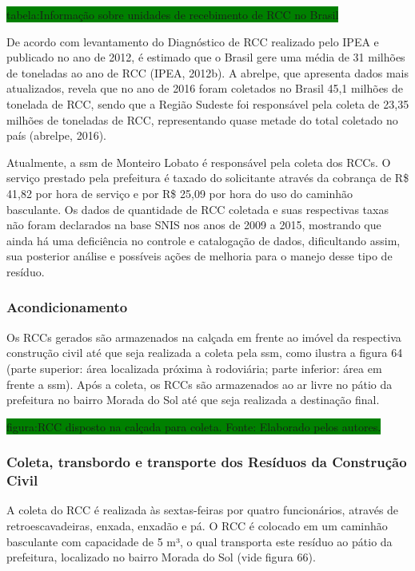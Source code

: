 	\colorbox{green}{tabela:Informação sobre unidades de recebimento de RCC no Brasil}
	
	De acordo com levantamento do Diagnóstico de RCC realizado pelo IPEA e publicado no ano de 2012, é estimado que o Brasil gere uma média de 31 milhões de toneladas ao ano de RCC (IPEA, 2012b). A \gls{abrelpe}, que apresenta dados mais atualizados, revela que no ano de 2016 foram coletados no Brasil 45,1 milhões de tonelada de RCC, sendo que a Região Sudeste foi responsável pela coleta de 23,35 milhões de toneladas de RCC, representando quase metade do total coletado no país (\gls{abrelpe}, 2016).	
	
	Atualmente, a \gls{ssm} de Monteiro Lobato é responsável pela coleta dos RCCs. O serviço prestado pela prefeitura é taxado do solicitante através da cobrança de R\$ 41,82 por hora de serviço e por R\$ 25,09 por hora do uso do caminhão basculante. Os dados de quantidade de RCC coletada e suas respectivas taxas não foram declarados na base SNIS nos anos de 2009 a 2015, mostrando que ainda há uma deficiência no controle e catalogação de dados, dificultando assim, sua posterior análise e possíveis ações de melhoria para o manejo desse tipo de resíduo.
	
	\subsubsection{Acondicionamento}
	Os RCCs gerados são armazenados na calçada em frente ao imóvel da respectiva construção civil até que seja realizada a coleta pela \gls{ssm}, como ilustra a figura 64 (parte superior: área localizada próxima à rodoviária; parte inferior: área em frente a \gls{ssm}). Após a coleta, os RCCs são armazenados ao ar livre no pátio da prefeitura no bairro Morada do Sol até que seja realizada a destinação final.
	
	\colorbox{green}{figura:RCC disposto na calçada para coleta. Fonte: Elaborado pelos autores.}
	
	\subsubsection{Coleta, transbordo e transporte dos Resíduos da Construção Civil}
	A coleta do RCC é realizada às sextas-feiras por quatro funcionários, através de retroescavadeiras, enxada, enxadão e pá. O RCC é colocado em um caminhão basculante com capacidade de 5 m³, o qual transporta este resíduo ao pátio da prefeitura, localizado no bairro Morada do Sol (vide figura 66).
	
